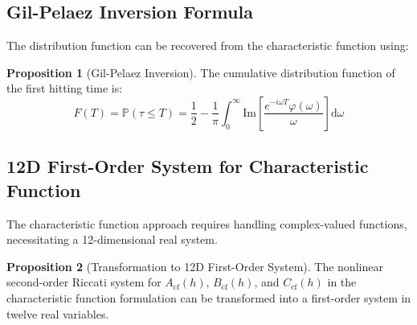 \documentclass{article}
\renewcommand{\P}{\mathbb{P}}
\newcommand{\diff}{\mathrm{d}}
\theoremstyle{definition}
\newtheorem{proposition}{Proposition}[section]
\begin{document}
\subsection{Gil-Pelaez Inversion Formula}

The distribution function can be recovered from the characteristic function using:
\begin{proposition}[Gil-Pelaez Inversion]
\label{prop:gilpelaez}
The cumulative distribution function of the first hitting time is:
\begin{equation}
F(T) = \P(\tau \leq T) = \frac{1}{2} - \frac{1}{\pi} \int_0^{\infty} \text{Im}\left[\frac{e^{-i\omega T} \varphi(\omega)}{\omega}\right] \diff\omega
\end{equation}
\end{proposition}

\subsection{12D First-Order System for Characteristic Function}

The characteristic function approach requires handling complex-valued functions, necessitating a 12-dimensional real system.

\begin{proposition}[Transformation to 12D First-Order System]
\label{prop:12d_transform_cf}
The nonlinear second-order Riccati system for $A_{\text{cf}}(h)$, $B_{\text{cf}}(h)$, and $C_{\text{cf}}(h)$ in the characteristic function formulation can be transformed into a first-order system in twelve real variables.
\end{proposition}
\end{document}
